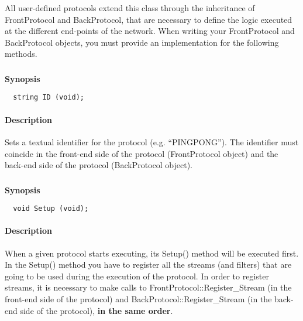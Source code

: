 \documentclass[twoside,a4,english,11pt]{book}
\begin{document}
  All user-defined protocols extend this class through the inheritance of FrontProtocol and BackProtocol, 
  that are necessary to define the logic executed at the different end-points of the network. When writing 
  your FrontProtocol and BackProtocol objects, you must provide an implementation for the following methods.
  
\subsubsection{}

\textbf{Synopsis}
\begin{lstlisting}
  string ID (void);
\end{lstlisting}
  
\paragraph{Description}
  Sets a textual identifier for the protocol (e.g. ``PINGPONG''). The identifier must coincide in the front-end 
  side of the protocol (FrontProtocol object) and the back-end side of the protocol (BackProtocol object).
  
\subsubsection{}

\textbf{Synopsis}
\begin{lstlisting}
  void Setup (void);
\end{lstlisting}
  
\paragraph{Description}
  When a given protocol starts executing, its Setup() method will be executed first. In the Setup() method
  you have to register all the streams (and filters) that are going to be used during the execution 
  of the protocol. In order to register streams, it is necessary to make calls to 
  FrontProtocol::Register\_Stream (in the front-end side of the protocol) and BackProtocol::Register\_Stream
  (in the back-end side of the protocol), \textbf{in the same order}.
  
\subsubsection{}
\end{document}
